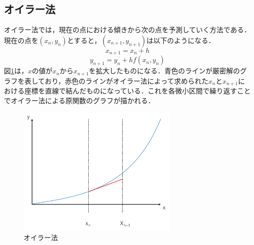 \documentclass[a4paper, 12pt]{ltjsarticle}
\begin{document}
\subsection{オイラー法}
オイラー法では，現在の点における傾きから次の点を予測していく方法である．現在の点を$(x_n,y_n)$とすると，$(x_{n+1},y_{n+1})$は以下のようになる．
\begin{equation}
  x_{n+1}=x_n+h
\end{equation}
\begin{equation}
  y_{n+1}=y_n+hf(x_n,y_n)
\end{equation}
\clearpage
図\ref{fig:オイラー法}は，$x$の値が$x_n$から$x_{n+1}$を拡大したものになる．青色のラインが厳密解のグラフを表しており，赤色のラインがオイラー法によって求められた$x_n$と$x_{n+1}$における座標を直線で結んだものになっている．これを各微小区間で繰り返すことでオイラー法による原関数のグラフが描かれる．
\begin{figure}[h]
\begin{center}
\includegraphics[clip,width=0.7\textwidth,keepaspectratio]{euler.pdf}
\end{center}
\caption{オイラー法}
\label{fig:オイラー法}
\end{figure}
\clearpage
\end{document}
